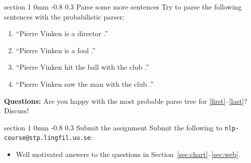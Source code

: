 \documentclass[11pt]{article}
\makeatletter
\newcommand{\newsec}[2]{\section{#1}\label{sec:#2}\noindent}
\renewcommand{\section}{\@startsection
{section}%
{1}%
{0mm}%
{-0.8\baselineskip}%
{0.3\baselineskip}%
{\bfseries\large}}%
\makeatother
\begin{document}
\newsec{Parse some more sentences}{web}%
Try to parse the following sentences with the probabilistic parser:
\begin{enumerate}[noitemsep,topsep=0.2cm]
\item ``Pierre Vinken is a director .''\label{first}
\item ``Pierre Vinken is a fool .''
\item ``Pierre Vinken hit the ball with the club .''
\item ``Pierre Vinken saw the man with the club .''\label{last}
\end{enumerate}
{\bf Questions:} Are you happy with the most probable parse tree for \ref{first}--\ref{last}? Discuss!

\newsec{Submit the assignment}{sub}%
Submit the following to {\tt nlp-course@stp.lingfil.uu.se}: 
\begin{itemize}[noitemsep,topsep=0.2cm]
\item Well motivated answers to the questions in Section~\ref{sec:chart}--\ref{sec:web}.
\end{itemize}
\end{document}
